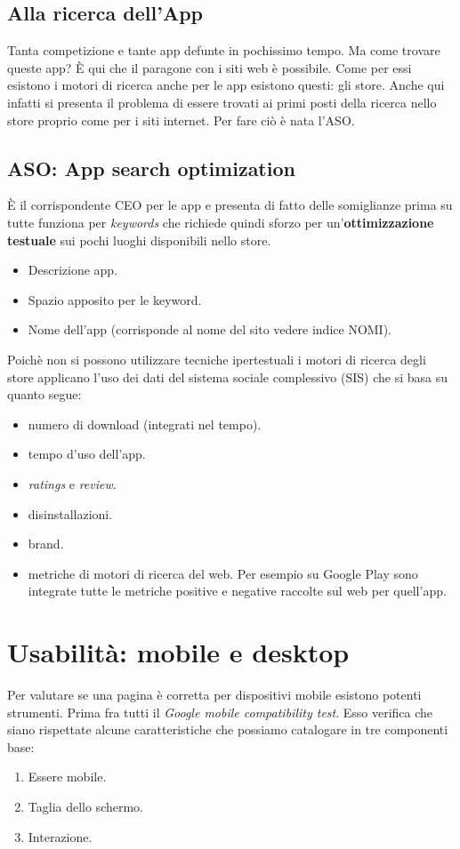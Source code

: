 		\subsection{Alla ricerca dell'App}
			Tanta competizione e tante app defunte in pochissimo tempo. Ma come trovare queste app? È qui che il paragone con i siti web è possibile. Come per essi esistono i motori di ricerca anche per le app esistono questi: gli store. Anche qui infatti si presenta il problema di essere trovati ai primi posti della ricerca nello store proprio come per i siti internet. Per fare ciò è nata l'ASO.
			
			\subsection{ASO: App search optimization}
				È il corrispondente CEO per le app e presenta di fatto delle somiglianze prima su tutte funziona per \emph{keywords} che richiede quindi sforzo per un'\textbf{ottimizzazione testuale} sui pochi luoghi disponibili nello store.
				\begin{itemize}
					\item Descrizione app.
					\item Spazio apposito per le keyword.
					\item Nome dell'app (corrisponde al nome del sito vedere indice NOMI).
				\end{itemize}
				Poichè non si possono utilizzare tecniche ipertestuali i motori di ricerca degli store applicano l'uso dei dati del sistema sociale complessivo (SIS) che si basa su quanto segue:
				\begin{itemize}
					\item numero di download (integrati nel tempo).
					\item tempo d'uso dell'app.
					\item \emph{ratings} e \emph{review}.
					\item disinstallazioni.
					\item brand.
					\item metriche di motori di ricerca del web. Per esempio su Google Play sono integrate tutte le metriche positive e negative raccolte sul web per quell'app.
				\end{itemize}
							
			
	\section{Usabilità: mobile e desktop}
		Per valutare se una pagina è corretta per dispositivi mobile esistono potenti strumenti. Prima fra tutti il \emph{Google mobile compatibility test}. Esso verifica che siano rispettate alcune caratteristiche che possiamo catalogare in tre componenti base:
		\begin{enumerate}
			\item Essere mobile.
			\item Taglia dello schermo.
			\item Interazione.
		\end{enumerate}
		
